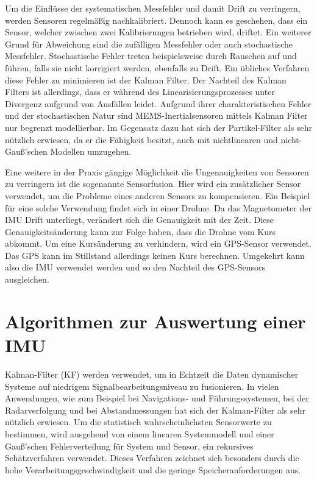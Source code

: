  Um die Einflüsse der systematischen Messfehler und damit Drift zu verringern, werden Sensoren regelmäßig nachkalibriert. 
Dennoch kann es geschehen, dass ein Sensor, welcher zwischen zwei Kalibrierungen betrieben wird, driftet. \cite{Traenkler:2014}
Ein weiterer Grund für Abweichung sind die zufälligen Messfehler oder auch stochastische Messfehler.
Stochastische Fehler treten beispielsweise durch Rauschen auf und führen, falls sie nicht korrigiert werden, ebenfalls zu Drift.
Ein übliches Verfahren diese Fehler zu minimieren ist der Kalman Filter. \cite{Narasimhappa:2020}
Der Nachteil des Kalman Filters ist allerdings, dass er während des Linearisierungsprozesses unter Divergenz aufgrund von Ausfällen leidet.
Aufgrund ihrer charakteristischen Fehler und der stochastischen Natur sind MEMS-Inertialsensoren mittels Kalman Filter nur begrenzt modellierbar.
Im Gegensatz dazu hat sich der Partikel-Filter als sehr nützlich erwiesen, da er die Fähigkeit besitzt, 
auch mit nichtlinearen und nicht-Gauß'schen Modellen umzugehen. \cite{Leon:2019}

Eine weitere in der Praxis gängige Möglichkeit die Ungenauigkeiten von Sensoren zu verringern ist die sogenannte Sensorfusion. Hier wird ein zusätzlicher Sensor verwendet, um die Probleme eines anderen Sensors zu kompensieren.  Ein Beispiel für eine solche Verwendung findet sich in einer Drohne. Da das Magnetometer der IMU Drift unterliegt, verändert sich die Genauigkeit mit der Zeit. Diese Genauigkeitsänderung kann zur Folge haben, dass die Drohne vom Kurs abkommt. Um eine Kursänderung zu verhindern, wird ein GPS-Sensor verwendet. Das GPS kann im Stillstand allerdings keinen Kurs berechnen. Umgekehrt kann also die IMU verwendet werden und so den Nachteil des GPS-Sensors ausgleichen. \cite{Weber:2021}



\section{Algorithmen zur Auswertung einer IMU}

Kalman-Filter (KF) werden verwendet, um in Echtzeit die Daten dynamischer Systeme auf niedrigem Signalbearbeitungsniveau zu fusionieren. In vielen Anwendungen, wie zum Beispiel bei Navigations- und Führungssystemen, bei der Radarverfolgung und bei Abstandmessungen hat sich der Kalman-Filter als sehr nützlich erwiesen. Um die statistisch wahrscheinlichsten Sensorwerte zu bestimmen, wird ausgehend von einem linearen Systemmodell und einer Gauß'schen Fehlerverteilung für System und Sensor, ein rekursives Schätzverfahren verwendet.  Dieses Verfahren zeichnet sich besonders durch die hohe Verarbeitungsgeschwindigkeit und die geringe Speicheranforderungen aus. \cite{Traenkler:2014} 

